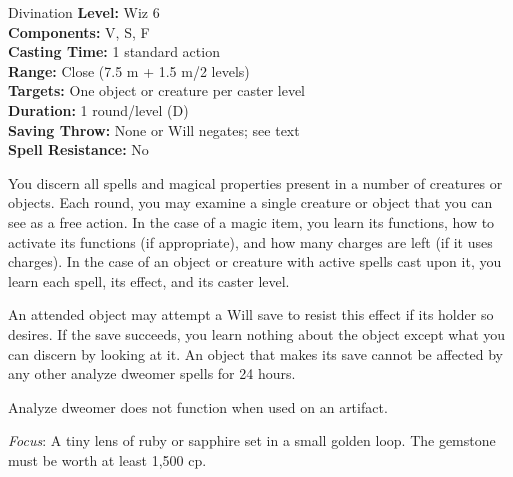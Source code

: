 {Divination}
{
	\textbf{Level:}
	Wiz 6\\
	\textbf{Components:}
	V, S, F\\
	\textbf{Casting Time:}
	1 standard action\\
	\textbf{Range:}
	Close (7.5 m + 1.5 m/2 levels)\\
	\textbf{Targets:}
	One object or creature per caster level\\
	\textbf{Duration:}
	1 round/level (D)\\
	\textbf{Saving Throw:}
	None or Will negates; see text\\
	\textbf{Spell Resistance:}
	No\\
}
{
	You discern all spells and magical properties present in a number of creatures or objects. Each round, you may examine a single creature or object that you can see as a free action. In the case of a magic item, you learn its functions, how to activate its functions (if appropriate), and how many charges are left (if it uses charges). In the case of an object or creature with active spells cast upon it, you learn each spell, its effect, and its caster level.

	An attended object may attempt a Will save to resist this effect if its holder so desires. If the save succeeds, you learn nothing about the object except what you can discern by looking at it. An object that makes its save cannot be affected by any other analyze dweomer spells for 24 hours.

	Analyze dweomer does not function when used on an artifact.

	\textit{Focus}:
	A tiny lens of ruby or sapphire set in a small golden loop. The gemstone must be worth at least 1,500 cp.

}
